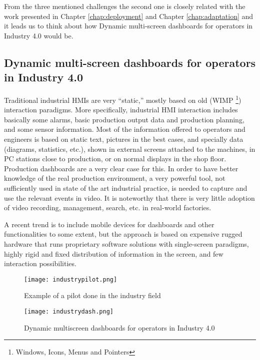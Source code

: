 From the three mentioned challenges the second one is closely related with the work presented in Chapter \ref{chap:deployment} and Chapter \ref{chap:adaptation} and it leads us to think about how Dynamic multi-screen dashboards for operators in Industry 4.0 would be.

\subsection{Dynamic multi-screen dashboards for operators in Industry 4.0}
Traditional industrial HMIs are very “static,” mostly based on old (WIMP \footnote{Windows, Icons, Menus and Pointers}) interaction paradigms. More specifically, industrial HMI interaction includes basically some alarms, basic production output data and production planning, and some sensor information. Most of the information offered to operators and engineers is based on static text, pictures in the best cases, and specially data (diagrams, statistics, etc.), shown in external screens attached to the machines, in PC stations close to production, or on normal displays in the shop floor. Production dashboards are a very clear case for this. In order to have better knowledge of the real production environment, a very powerful tool, not sufficiently used in state of the art industrial practice, is needed to capture and use the relevant events in video. It is noteworthy that there is very little adoption of video recording, management, search, etc. in real-world factories.

A recent trend is to include mobile devices for dashboards and other functionalities to some extent, but the approach is based on expensive rugged hardware that runs proprietary software
solutions with single-screen paradigms, highly rigid and fixed distribution of information in the screen, and few interaction possibilities.


\begin{figure}
	\begin{center}
		\texttt{[image: industrypilot.png]}
		\caption{Example of a pilot done in the industry field}
		\label{fig:indpilot}
	\end{center}
\end{figure}

\begin{figure}
	\begin{center}
		\texttt{[image: industrydash.png]}
		\caption{Dynamic multiscreen dashboards for operators in Industry 4.0}
		\label{fig:industrydash}
	\end{center}
\end{figure}

